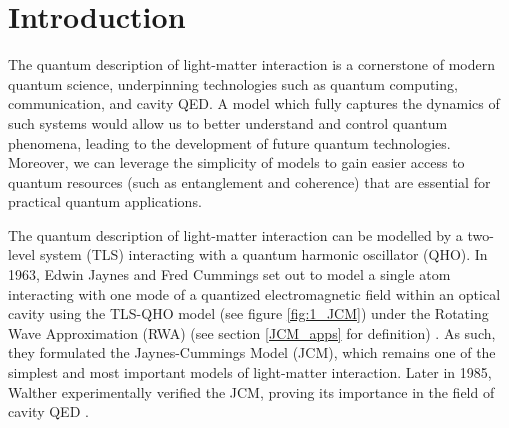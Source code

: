 \documentclass[12pt,a4paper]{article}
\begin{document}
\newpage

\tableofcontents

\newpage

\section{Introduction} \label{intro}

The quantum description of light-matter interaction is a cornerstone of modern quantum science, underpinning technologies such as quantum computing, communication, and cavity QED. A model which fully captures the dynamics of such systems would allow us to better understand and control quantum phenomena, leading to the development of future quantum technologies. Moreover, we can leverage the simplicity of models to gain easier access to quantum resources (such as entanglement and coherence) that are essential for practical quantum applications.


The quantum description of light-matter interaction can be modelled by a two-level system (TLS) interacting with a quantum harmonic oscillator (QHO). In 1963, Edwin Jaynes and Fred Cummings set out to model a single atom interacting with one mode of a quantized electromagnetic field within an optical cavity using the TLS-QHO model (see figure \ref{fig:1_JCM}) under the Rotating Wave Approximation (RWA) (see section \ref{JCM_apps} for definition) \cite{Context1963-JC_Original}. As such, they formulated the Jaynes-Cummings Model (JCM), which remains one of the simplest and most important models of light-matter interaction. Later in 1985, Walther experimentally verified the JCM, proving its importance in the field of cavity QED \cite{Context1993-JC_Verification}. 
\end{document}

